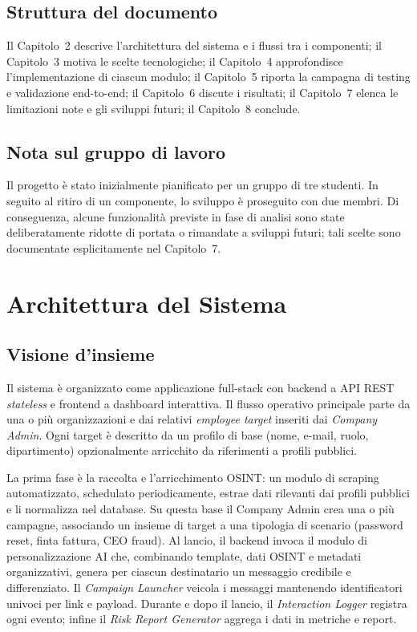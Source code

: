 \documentclass[12pt,a4paper,oneside]{report}
\begin{document}
\section{Struttura del documento}
Il Capitolo~2 descrive l'architettura del sistema e i flussi tra i componenti; il
Capitolo~3 motiva le scelte tecnologiche; il Capitolo~4 approfondisce l'implementazione di
ciascun modulo; il Capitolo~5 riporta la campagna di testing e validazione end-to-end; il
Capitolo~6 discute i risultati; il Capitolo~7 elenca le limitazioni note e gli sviluppi
futuri; il Capitolo~8 conclude.

\section{Nota sul gruppo di lavoro}
Il progetto \`e stato inizialmente pianificato per un gruppo di tre studenti. In seguito
al ritiro di un componente, lo sviluppo \`e proseguito con due membri. Di conseguenza,
alcune funzionalit\`a previste in fase di analisi sono state deliberatamente ridotte di
portata o rimandate a sviluppi futuri; tali scelte sono documentate esplicitamente nel
Capitolo~7.

\chapter{Architettura del Sistema}

\section{Visione d'insieme}
Il sistema \`e organizzato come applicazione full-stack con backend a API REST
\emph{stateless} e frontend a dashboard interattiva. Il flusso operativo principale parte
da una o pi\`u organizzazioni e dai relativi \emph{employee target} inseriti dai
\emph{Company Admin}. Ogni target \`e descritto da un profilo di base (nome, e-mail, ruolo,
dipartimento) opzionalmente arricchito da riferimenti a profili pubblici.

La prima fase \`e la raccolta e l'arricchimento OSINT: un modulo di scraping automatizzato,
schedulato periodicamente, estrae dati rilevanti dai profili pubblici e li normalizza nel
database. Su questa base il Company Admin crea una o pi\`u campagne, associando un insieme
di target a una tipologia di scenario (password reset, finta fattura, CEO fraud). Al lancio,
il backend invoca il modulo di personalizzazione AI che, combinando template, dati OSINT e
metadati organizzativi, genera per ciascun destinatario un messaggio credibile e
differenziato. Il \emph{Campaign Launcher} veicola i messaggi mantenendo identificatori
univoci per link e payload. Durante e dopo il lancio, il \emph{Interaction Logger} registra
ogni evento; infine il \emph{Risk Report Generator} aggrega i dati in metriche e report.
\end{document}
